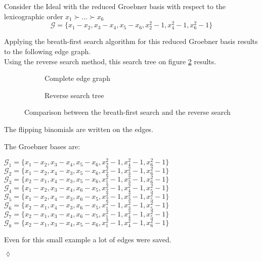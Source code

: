 \begin{env_example}\normalfont
Consider the Ideal with the reduced Groebner basis with respect to the lexicographic order $x_{1} \succ \ldots \succ x_{6} $
\[ \mathcal{G} = \{x_{1} - x_{2}, x_{3} - x_{4}, x_{5}-x_{6} , x_{2}^{2} -1 , x_{4}^{2} - 1, x_{6}^{2} - 1 \} \]

Applying the breath-first search algorithm for this reduced Groebner basis results to the following edge graph.\\
Using the reverse search method, this search tree on figure \ref{fig:reverse} results.


\begin{figure}[h]
    \centering
    \begin{subfigure}[b]{0.48\linewidth}        %
        \centering
        
        \caption{Complete edge graph}
        \label{fig:breadth}
    \end{subfigure}
    \begin{subfigure}[b]{0.48\linewidth}        %
        \centering
        
        \caption{Reverse search tree}
        \label{fig:reverse}
    \end{subfigure}
    \caption{Comparison between the breath-first search and the reverse search}
    \label{fig:graph}
\end{figure}
\newpage
The flipping binomials are written on the edges.

The Groebner bases are:
\begin{center}
$\mathcal{G}_{1} = \{x_{1}-x_{2},x_{3}-x_{4},x_{5}-x_{6},x_{2}^{2}-1,x_{4}^{2}-1,x_{6}^{2}-1 \} $ \\
$\mathcal{G}_{2} = \{x_{1}-x_{2},x_{4}-x_{3},x_{5}-x_{6},x_{2}^{2}-1,x_{3}^{2}-1,x_{6}^{2}-1 \} $ \\
$\mathcal{G}_{3} = \{x_{2}-x_{1},x_{4}-x_{3},x_{5}-x_{6},x_{1}^{2}-1,x_{3}^{2}-1,x_{6}^{2}-1 \} $ \\
$\mathcal{G}_{4} = \{x_{1}-x_{2},x_{3}-x_{4},x_{6}-x_{5},x_{2}^{2}-1,x_{4}^{2}-1,x_{5}^{2}-1 \} $ \\
$\mathcal{G}_{5} = \{x_{1}-x_{2},x_{4}-x_{3},x_{6}-x_{5},x_{2}^{2}-1,x_{3}^{2}-1,x_{5}^{2}-1 \} $ \\
$\mathcal{G}_{6} = \{x_{2}-x_{1},x_{4}-x_{3},x_{6}-x_{5},x_{1}^{2}-1,x_{3}^{2}-1,x_{5}^{2}-1 \} $ \\
$\mathcal{G}_{7} = \{x_{2}-x_{1},x_{3}-x_{4},x_{6}-x_{5},x_{1}^{2}-1,x_{4}^{2}-1,x_{5}^{2}-1 \} $ \\
$\mathcal{G}_{8} = \{x_{2}-x_{1},x_{3}-x_{4},x_{5}-x_{6},x_{1}^{2}-1,x_{4}^{2}-1,x_{6}^{2}-1 \} $ \\
\end{center}

Even for this small example a lot of edges were saved.
\begin{flushright}
$\lozenge$
\end{flushright}
\end{env_example}




